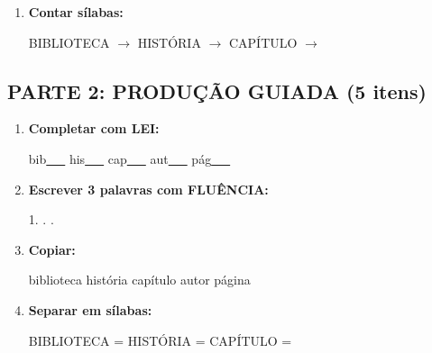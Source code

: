 \begin{exercicio}
\begin{enumerate}
  \item \textbf{Contar sílabas:}
  \begin{center}
  BIBLIOTECA $\rightarrow$ \underline{\hspace{0.9cm}} \quad HISTÓRIA $\rightarrow$ \underline{\hspace{0.9cm}} \quad CAPÍTULO $\rightarrow$ \underline{\hspace{0.9cm}}
  \end{center}

\end{enumerate}

\subsection*{PARTE 2: PRODUÇÃO GUIADA (5 itens)}

\begin{enumerate}[resume]

  \item \textbf{Completar com LEI:}
  \begin{center}
  bib\underline{~~~} \quad his\underline{~~~} \quad cap\underline{~~~} \quad aut\underline{~~~} \quad pág\underline{~~~}
  \end{center}

  \item \textbf{Escrever 3 palavras com FLUÊNCIA:}
  \begin{center}
  1. \underline{\hspace{3cm}} . \underline{\hspace{3cm}} . \underline{\hspace{3cm}}
  \end{center}

  \item \textbf{Copiar:}
  \begin{center}
  biblioteca \quad história \quad capítulo \quad autor \quad página
  \end{center}

  \item \textbf{Separar em sílabas:}
  \begin{center}
  BIBLIOTECA = \underline{\hspace{1cm}} \underline{\hspace{1cm}} \quad HISTÓRIA = \underline{\hspace{1cm}} \underline{\hspace{1cm}} \quad CAPÍTULO = \underline{\hspace{1cm}} \underline{\hspace{1cm}}
  \end{center}


\end{enumerate}
\end{exercicio}
